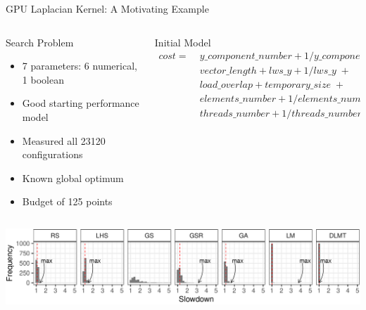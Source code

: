 \documentclass[10pt, compress, aspectratio=169, xcolor={table,usenames,dvipsnames}]{beamer}
\begin{document}
\begin{frame}[label={sec:orgfa13c78}]{GPU Laplacian Kernel: A Motivating Example}
\begin{columns}
\begin{column}{0.5\columnwidth}
\begin{block}{Search Problem}
\begin{itemize}
\item 7 parameters: 6 \alert{numerical}, 1 \alert{boolean}
\item Good starting performance model
\item Measured all 23120 configurations
\item Known \alert{global optimum}
\item Budget of \alert{125 points}
\end{itemize}
\end{block}
\end{column}

\begin{column}{0.5\columnwidth}
\begin{block}{Initial Model}
\footnotesize
\begin{align*}
cost = & \; y\_component\_number + 1 / y\_component\_number \; + \\
& \; vector\_length + lws\_y + 1 / lws\_y \; + \\
& \; load\_overlap + temporary\_size \; + \\
& \; elements\_number + 1 / elements\_number \; + \\
& \; threads\_number + 1 / threads\_number
\end{align*}
\normalsize
\end{block}
\end{column}
\end{columns}

\vspace{-.3cm}


\vspace{-.3cm}

\begin{center}
\begin{center}
\includegraphics[width=\columnwidth]{../../../img/comparison_histogram.pdf}
\end{center}
\end{center}
\end{frame}
\end{document}

